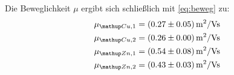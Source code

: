Die Beweglichkeit $\mu$ ergibt sich schließlich mit \eqref{eq:beweg} zu:
\begin{align}
\begin{aligned}
\mu\ua{Cu,1} &= (0.27 \pm 0.05) \, \si{\meter^2 \per \volt \second}  \\%
\mu\ua{Cu,2} &= (0.26 \pm 0.00) \, \si{\meter^2 \per \volt \second}  \\
\mu\ua{Zn,1} &= (0.54 \pm 0.08) \, \si{\meter^2 \per \volt \second}  \\
\mu\ua{Zn,2} &= (0.43 \pm 0.03) \, \si{\meter^2 \per \volt \second}
\end{aligned}
\end{align}
